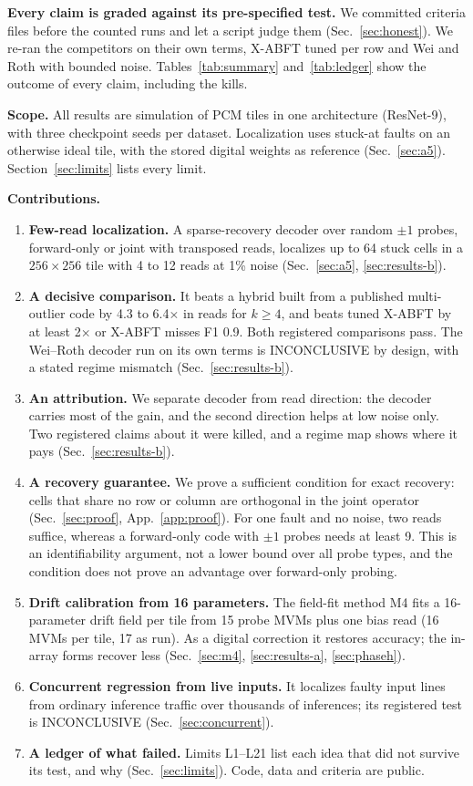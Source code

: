 \documentclass[journal]{IEEEtran}
\newcommand{\mfour}{\textsc{M4}}
\begin{document}
\textbf{Every claim is graded against its pre-specified test.} We committed criteria files before the counted runs and let a script judge them (Sec.~\ref{sec:honest}). We re-ran the competitors on their own terms, X-ABFT tuned per row and Wei and Roth with bounded noise. Tables~\ref{tab:summary} and~\ref{tab:ledger} show the outcome of every claim, including the kills.

\textbf{Scope.} All results are simulation of PCM tiles in one architecture (ResNet-9), with three checkpoint seeds per dataset. Localization uses stuck-at faults on an otherwise ideal tile, with the stored digital weights as reference (Sec.~\ref{sec:a5}). Section~\ref{sec:limits} lists every limit.

\textbf{Contributions.}
\begin{enumerate}
\item \textbf{Few-read localization.} A sparse-recovery decoder over random $\pm1$ probes, forward-only or joint with transposed reads, localizes up to 64 stuck cells in a $256\times256$ tile with 4 to 12 reads at 1\% noise (Sec.~\ref{sec:a5}, \ref{sec:results-b}).
\item \textbf{A decisive comparison.} It beats a hybrid built from a published multi-outlier code by 4.3 to 6.4$\times$ in reads for $k\ge4$, and beats tuned X-ABFT by at least 2$\times$ or X-ABFT misses F1 0.9. Both registered comparisons pass. The Wei--Roth decoder run on its own terms is INCONCLUSIVE by design, with a stated regime mismatch (Sec.~\ref{sec:results-b}).
\item \textbf{An attribution.} We separate decoder from read direction: the decoder carries most of the gain, and the second direction helps at low noise only. Two registered claims about it were killed, and a regime map shows where it pays (Sec.~\ref{sec:results-b}).
\item \textbf{A recovery guarantee.} We prove a sufficient condition for exact recovery: cells that share no row or column are orthogonal in the joint operator (Sec.~\ref{sec:proof}, App.~\ref{app:proof}). For one fault and no noise, two reads suffice, whereas a forward-only code with $\pm1$ probes needs at least 9. This is an identifiability argument, not a lower bound over all probe types, and the condition does not prove an advantage over forward-only probing.
\item \textbf{Drift calibration from 16 parameters.} The field-fit method \mfour{} fits a 16-parameter drift field per tile from 15 probe MVMs plus one bias read (16 MVMs per tile, 17 as run). As a digital correction it restores accuracy; the in-array forms recover less (Sec.~\ref{sec:m4}, \ref{sec:results-a}, \ref{sec:phaseh}).
\item \textbf{Concurrent regression from live inputs.} It localizes faulty input lines from ordinary inference traffic over thousands of inferences; its registered test is INCONCLUSIVE (Sec.~\ref{sec:concurrent}).
\item \textbf{A ledger of what failed.} Limits L1--L21 list each idea that did not survive its test, and why (Sec.~\ref{sec:limits}). Code, data and criteria are public.
\end{enumerate}
\end{document}
